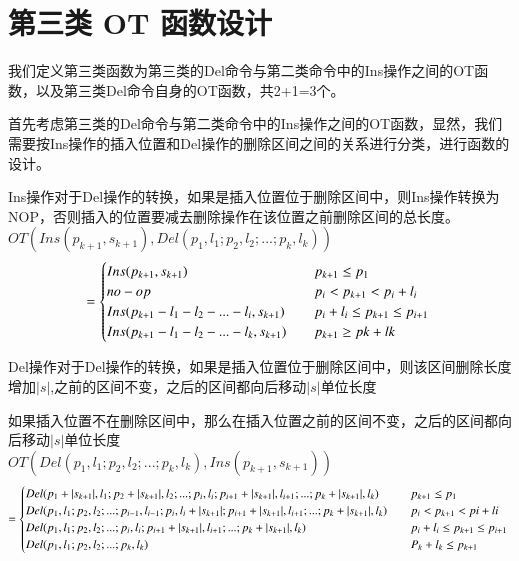 \section{第三类 OT 函数设计}
\par 我们定义第三类函数为第三类的Del命令与第二类命令中的Ins操作之间的OT函数，以及第三类Del命令自身的OT函数，共2+1=3个。
\par 首先考虑第三类的Del命令与第二类命令中的Ins操作之间的OT函数，显然，我们需要按Ins操作的插入位置和Del操作的删除区间之间的关系进行分类，进行函数的设计。
\par Ins操作对于Del操作的转换，如果是插入位置位于删除区间中，则Ins操作转换为NOP，否则插入的位置要减去删除操作在该位置之前删除区间的总长度。\\
$OT(Ins(p_{k+1},s_{k+1}),Del(p_1,l_1;p_2,l_2;...;p_k,l_k))$\\
\begin{equation}
= \begin{cases}
Ins(p_{k+1},s_{k+1}) \quad & p_{k+1} \le p_1 \\
no-op \quad & p_i<p_{k+1}<p_i+l_i\\
Ins(p_{k+1}-l_1-l_2-...-l_i,s_{k+1}) \quad & p_i+l_i \le p_{k+1} \le p_{i+1}\\
Ins(p_{k+1}-l_1-l_2-...-l_k,s_{k+1}) \quad & p_{k+1} \ge pk+lk \end{cases}\\
\end{equation}

\par Del操作对于Del操作的转换，如果是插入位置位于删除区间中，则该区间删除长度增加$|s|$,之前的区间不变，之后的区间都向后移动$|s|$单位长度
\par 如果插入位置不在删除区间中，那么在插入位置之前的区间不变，之后的区间都向后移动$|s|$单位长度\\
$OT(Del(p_1,l_1;p_2,l_2;...;p_k,l_k),Ins(p_{k+1},s_{k+1}))$\\
\begin{equation}
= \begin{cases}
Del(p_1+|s_{k+1}|,l_1;p_2+|s_{k+1}|,l_2;...;p_i,l_i;p_{i+1}+|s_{k+1}|,l_{i+1};...;p_k+|s_{k+1}|,l_k) & \quad p_{k+1} \le p_1 \\
Del(p_1,l_1;p_2,l_2;...;p_{i-1},l_{i-1};p_i,l_i+|s_{k+1}|;p_{i+1}+|s_{k+1}|,l_{i+1};...;p_k+|s_{k+1}|,l_k) &\quad p_i<p_{k+1} < pi+li \\
Del(p_1,l_1;p_2,l_2;...;p_i,l_i;p_{i+1}+|s_{k+1}|,l_{i+1};...;p_k+|s_{k+1}|,l_k) & \quad p_i+l_i \le p_{k+1} \le p_{i+1}\\
Del(p_1,l_1;p_2,l_2;...;p_k,l_k) &\quad P_k+l_k \le p_{k+1} \\
 \end{cases}\\
\end{equation}

